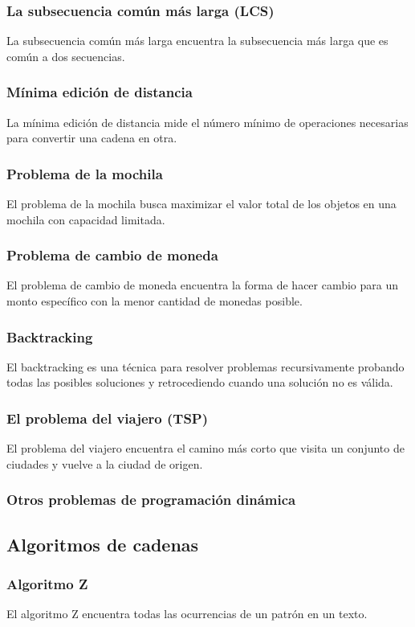 \subsubsection{La subsecuencia común más larga (LCS)}
La subsecuencia común más larga encuentra la subsecuencia más larga que es común a dos secuencias.
\subsubsection{Mínima edición de distancia}
La mínima edición de distancia mide el número mínimo de operaciones necesarias para convertir una cadena en otra.
\subsubsection{Problema de la mochila}
El problema de la mochila busca maximizar el valor total de los objetos en una mochila con capacidad limitada.
\subsubsection{Problema de cambio de moneda}
El problema de cambio de moneda encuentra la forma de hacer cambio para un monto específico con la menor cantidad de monedas posible.
\subsubsection{Backtracking}
El backtracking es una técnica para resolver problemas recursivamente probando todas las posibles soluciones y retrocediendo cuando una solución no es válida.
\subsubsection{El problema del viajero (TSP)}
El problema del viajero encuentra el camino más corto que visita un conjunto de ciudades y vuelve a la ciudad de origen.
\subsubsection{Otros problemas de programación dinámica}

\subsection{Algoritmos de cadenas}
\subsubsection{Algoritmo Z}
El algoritmo Z encuentra todas las ocurrencias de un patrón en un texto.
